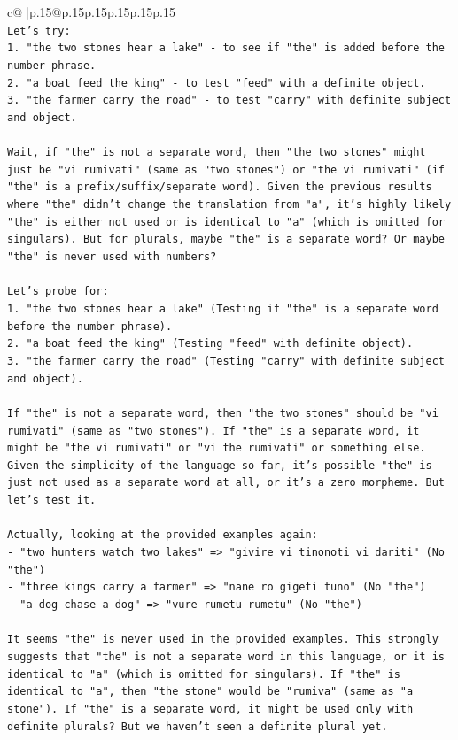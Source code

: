 \documentclass{article}
\begin{document}
{\begin{supertabular}{c@{$\;$}|p{.15\linewidth}@{}p{.15\linewidth}p{.15\linewidth}p{.15\linewidth}p{.15\linewidth}p{.15\linewidth}}
{{{\\ 
\texttt{Let's try:} \\
\texttt{1. "the two stones hear a lake" {-} to see if "the" is added before the number phrase.} \\
\texttt{2. "a boat feed the king" {-} to test "feed" with a definite object.} \\
\texttt{3. "the farmer carry the road" {-} to test "carry" with definite subject and object.} \\
\\ 
\texttt{Wait, if "the" is not a separate word, then "the two stones" might just be "vi rumivati" (same as "two stones") or "the vi rumivati" (if "the" is a prefix/suffix/separate word). Given the previous results where "the" didn't change the translation from "a", it's highly likely "the" is either not used or is identical to "a" (which is omitted for singulars). But for plurals, maybe "the" is a separate word? Or maybe "the" is never used with numbers?} \\
\\ 
\texttt{Let's probe for:} \\
\texttt{1. "the two stones hear a lake" (Testing if "the" is a separate word before the number phrase).} \\
\texttt{2. "a boat feed the king" (Testing "feed" with definite object).} \\
\texttt{3. "the farmer carry the road" (Testing "carry" with definite subject and object).} \\
\\ 
\texttt{If "the" is not a separate word, then "the two stones" should be "vi rumivati" (same as "two stones"). If "the" is a separate word, it might be "the vi rumivati" or "vi the rumivati" or something else. Given the simplicity of the language so far, it's possible "the" is just not used as a separate word at all, or it's a zero morpheme. But let's test it.} \\
\\ 
\texttt{Actually, looking at the provided examples again:} \\
\texttt{{-} "two hunters watch two lakes" => "givire vi tinonoti vi dariti" (No "the")} \\
\texttt{{-} "three kings carry a farmer" => "nane ro gigeti tuno" (No "the")} \\
\texttt{{-} "a dog chase a dog" => "vure rumetu rumetu" (No "the")} \\
\\ 
\texttt{It seems "the" is never used in the provided examples. This strongly suggests that "the" is not a separate word in this language, or it is identical to "a" (which is omitted for singulars). If "the" is identical to "a", then "the stone" would be "rumiva" (same as "a stone"). If "the" is a separate word, it might be used only with definite plurals? But we haven't seen a definite plural yet.} \\
}}}
\end{supertabular}}
\end{document}
